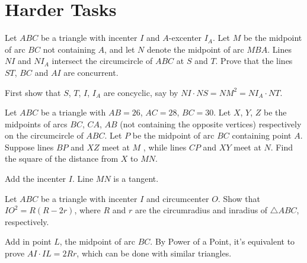 \documentclass[11pt]{scrartcl}
\begin{document}
\section{Harder Tasks}
\begin{problem}
	[Iran 2001] Let $ABC$ be a triangle with incenter $I$ and $A$-excenter $I_A$. Let $M$ be the midpoint of arc $BC$ not containing $A$, and let $N$ denote the midpoint of arc $MBA$.
	Lines $NI$ and $NI_A$ intersect the circumcircle of $ABC$ at $S$ and $T$.
	Prove that the lines $ST$, $BC$ and $AI$ are concurrent.
	\begin{hint}
		First show that $S$, $T$, $I$, $I_A$ are concyclic, say by $NI \cdot NS = NM^2 = NI_A \cdot NT$.
	\end{hint}
\end{problem}

\begin{problem}
	 Let $ABC$ be a triangle with $AB=26$, $AC=28$, $BC=30$. Let $X$, $Y$, $Z$ be the midpoints of arcs $BC$, $CA$, $AB$ (not containing the opposite vertices) respectively on the circumcircle of $ABC$. Let $P$ be the midpoint of arc $BC$ containing point $A$. Suppose lines $BP$ and $XZ$ meet at $M$ , while lines $CP$ and $XY$ meet at $N$. Find the square of the distance from $X$ to $MN$.
	\begin{hint}
		Add the incenter $I$.
		Line $MN$ is a tangent.
	\end{hint}
\end{problem}

\begin{problem}
	[Euler]
	Let $ABC$ be a triangle with incenter $I$ and circumcenter $O$.
	Show that $IO^2 = R(R-2r)$, where $R$ and $r$ are the circumradius and inradius of $\triangle ABC$, respectively.
	\begin{hint}
		Add in point $L$, the midpoint of arc $BC$.
		By Power of a Point, it's equivalent to prove $AI \cdot IL = 2Rr$,
		which can be done with similar triangles.
	\end{hint}
\end{problem}

\end{document}
